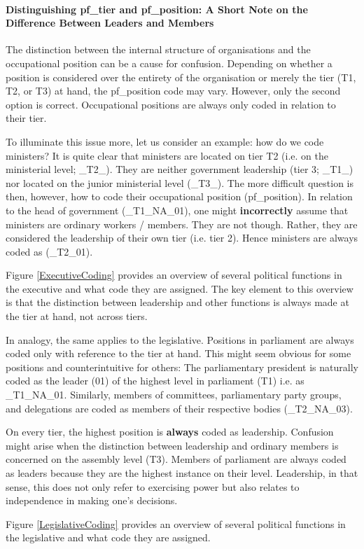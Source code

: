 \documentclass{article}
\begin{document}
\paragraph{Distinguishing pf\_tier and pf\_position: A Short Note on the Difference Between Leaders and Members}\label{level3and5}
\par\textit{}\par
The distinction between the internal structure of organisations and the occupational position can be a cause for confusion. Depending on whether a position is considered over the entirety of the organisation or merely the tier (T1, T2, or T3) at hand, the pf\_position code may vary. However, only the second option is correct. Occupational positions are always only coded in relation to their tier.\par
To illuminate this issue more, let us consider an example: how do we code ministers? It is quite clear that ministers are located on tier T2  (i.e. on the ministerial level; \_T2\_). They are neither government leadership (tier 3; \_T1\_) nor located on the junior ministerial level (\_T3\_). The more difficult question is then, however, how to code their occupational position (pf\_position). In relation to the head of government (\_T1\_NA\_01), one might \textbf{incorrectly} assume that ministers are ordinary workers / members. They are not though. Rather, they are considered the leadership of their own tier (i.e. tier 2). Hence ministers are always coded as (\_T2\_01).\par
Figure \ref{ExecutiveCoding} provides an overview of several political functions in the executive and what code they are assigned. The key element to this overview is that the distinction between leadership and other functions is always made at the tier at hand, not across tiers.\par
In analogy, the same applies to the legislative. Positions in parliament are always coded only with reference to the tier at hand. This might seem obvious for some positions and counterintuitive for others: The parliamentary president is naturally coded as the leader (01) of the highest level in parliament (T1) i.e. as \_T1\_NA\_01. Similarly, members of committees, parliamentary party groups, and delegations are coded as members of their respective bodies (\_T2\_NA\_03).\par
On every tier, the highest position is \textbf{always} coded as leadership. Confusion might arise when the distinction between leadership and ordinary members is concerned on the assembly level (T3). Members of parliament are always coded as leaders because they are the highest instance on their level. Leadership, in that sense, this does not only refer to exercising power but also relates to independence in making one's decisions.\par
Figure \ref{LegislativeCoding} provides an overview of several political functions in the legislative and what code they are assigned.\par
\end{document}
